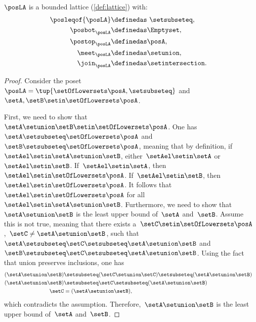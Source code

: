 \begin{lemma}
    $\posLA$ is a bounded lattice (\cref{def:lattice}) with:
    \begin{equation}
        \begin{aligned}
            \posleqof{\posLA} & \definedas \ \setsubseteq, \\
            \posbot_{\posLA}  & \definedas \Emptyset, \\
            \postop_{\posLA}  & \definedas \posA, \\
            \meet_{\posLA}    & \definedas \setunion, \\
            \join_{\posLA}    & \definedas \setintersection.
        \end{aligned}
    \end{equation}
\end{lemma}
\begin{proof}
    Consider the poset~$\posLA=\tup{\setOfLowersets \posA,\setsubseteq}$ and~$\setA,\setB\setin \setOfLowersets \posA$.

    First, we need to show that~$\setA\setunion \setB\setin \setOfLowersets \posA$.
    One has~$\setA \setsubseteq \setOfLowersets \posA$ and~$\setB\setsubseteq \setOfLowersets \posA$, meaning that by definition, if~$\setAel\setin \setA\setunion \setB$, either~$\setAel\setin \setA$ or~$\setAel\setin \setB$.
    If~$\setAel\setin \setA$, then~$\setAel\setin \setOfLowersets \posA$.
    If~$\setAel\setin \setB$, then~$\setAel\setin \setOfLowersets \posA$.
    It follows that~$\setAel\setin \setOfLowersets \posA$ for all~$\setAel\setin \setA\setunion \setB$.
    Furthermore, we need to show that~$\setA\setunion \setB$ is the least upper bound of~$\setA$ and~$\setB$.
    Assume this is not true, meaning that there exists a~$\setC\setin \setOfLowersets \posA$,~$\setC\neq \setA\setunion \setB$, such that~$\setA\setsubseteq \setC\setsubseteq \setA\setunion \setB$ and~$\setB\setsubseteq \setC\setsubseteq \setA\setunion \setB$.
    Using the fact that union preserves inclusions, one has
    \begin{equation}
        \begin{aligned}
            (\setA\setunion \setB)
                                   & \setsubseteq (\setC\setunion \setC) \setsubseteq (\setA\setunion \setB) \\
            (\setA\setunion \setB) & \setsubseteq \setC \setsubseteq (\setA\setunion \setB) \\
            \setC                  & = (\setA\setunion \setB),
        \end{aligned}
    \end{equation}
    which contradicts the assumption.
    Therefore,~$\setA\setunion \setB$ is the least upper bound of~$\setA$ and~$\setB$.


\end{proof}
